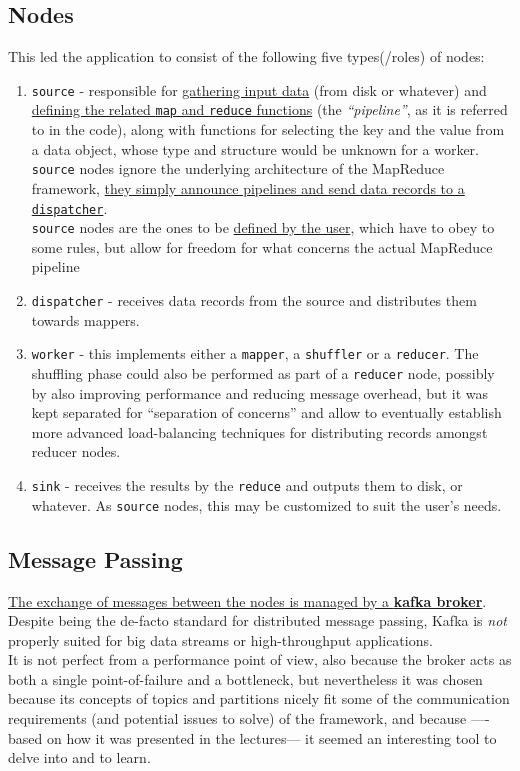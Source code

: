 \subsection{Nodes}
This led the application to consist of the following five types(/roles) of nodes:
\begin{enumerate}
   \item \texttt{source} - responsible for \ul{gathering input data} (from disk or whatever) and \ul{defining the related \texttt{map} and \texttt{reduce} functions} (the \textit{``pipeline''}, as it is referred to in the code), along with functions for selecting the key and the value from a data object, whose type and structure would be unknown for a worker.\\
   \texttt{source} nodes ignore the underlying architecture of the MapReduce framework, \ul{they simply announce pipelines and send data records to a \texttt{dispatcher}}.\\
   \texttt{source} nodes are the ones to be \ul{defined by the user}, which have to obey to some rules, but allow for freedom for what concerns the actual MapReduce pipeline
   \item \texttt{dispatcher} - receives data records from the source and distributes them towards mappers.
   \item \texttt{worker} - this implements either a \texttt{mapper}, a \texttt{shuffler} or a \texttt{reducer}. The shuffling phase could also be performed as part of a \texttt{reducer} node, possibly by also improving performance and reducing message overhead, but it was kept separated for ``separation of concerns'' and allow to eventually establish more advanced load-balancing techniques for distributing records amongst reducer nodes.
   \item \texttt{sink} - receives the results by the \texttt{reduce} and outputs them to disk, or whatever. As \texttt{source} nodes, this may be customized to suit the user's needs.
   
\end{enumerate}

\subsection{Message Passing}
\ul{The exchange of messages between the nodes is managed by a \textbf{kafka broker}}. 
Despite being the de-facto standard for distributed message passing, Kafka is \textit{not} properly suited for big data streams or high-throughput applications.\\
It is not perfect from a performance point of view, also because the broker acts as both a single point-of-failure and a bottleneck, but nevertheless it was chosen because its concepts of topics and partitions nicely fit some of the communication requirements (and potential issues to solve) of the framework, and because ----based on how it was presented in the lectures--- it seemed an interesting tool to delve into and to learn.

